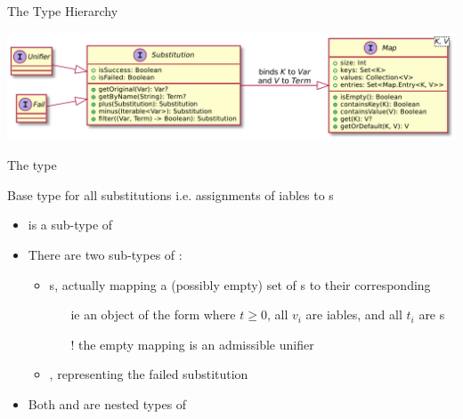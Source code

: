 \documentclass[handout]{beamer}
\begin{document}
\begin{frame}[allowframebreaks]{The  Type Hierarchy}
    \begin{center}
        \includegraphics[width=.8\linewidth]{img/substitutions.pdf}
    \end{center}

    \begin{block}{The  type}\centering
        \begin{center}
            Base type for all \alert{substitutions} i.e. assignments of iables to s
        \end{center}
        \begin{itemize}
            \item {} is a sub-type of 

            \item There are two sub-types of :
            \begin{itemize}
                \item \alert{s}, actually mapping a (possibly empty) set of s to their corresponding 
                \begin{itemize}
                    \item[ie] an object of the form  where $t \geq 0$, all $v_i$ are iables, and all $t_i$ are s
                    \item[!] the empty mapping is an admissible unifier
                \end{itemize}
                \item \alert{}, representing the \alert{failed} substitution
            \end{itemize}

            \item Both  and  are nested types of 
        \end{itemize}
    \end{block}


\end{frame}
\end{document}
